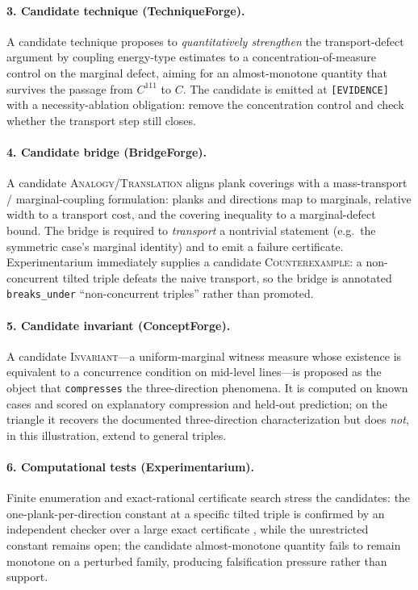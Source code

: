 \documentclass[11pt]{article}
\theoremstyle{definition}
\theoremstyle{remark}
\newcommand{\state}[1]{\texttt{[#1]}}
\newcommand{\rel}[1]{\texttt{#1}}
\newcommand{\ntype}[1]{\textsc{#1}}
\begin{document}
\paragraph{3. Candidate technique (TechniqueForge).} A candidate technique proposes to
\emph{quantitatively strengthen} the transport-defect argument by coupling energy-type estimates to a
concentration-of-measure control on the marginal defect, aiming for an almost-monotone quantity that
survives the passage from $C^{111}$ to $C$. The candidate is emitted at \state{EVIDENCE} with a
necessity-ablation obligation: remove the concentration control and check whether the transport step
still closes.

\paragraph{4. Candidate bridge (BridgeForge).} A candidate \ntype{Analogy}/\ntype{Translation}
aligns plank coverings with a mass-transport / marginal-coupling formulation: planks and directions
map to marginals, relative width to a transport cost, and the covering inequality to a
marginal-defect bound. The bridge is required to \emph{transport} a nontrivial statement (e.g.\ the
symmetric case's marginal identity) and to emit a failure certificate. Experimentarium immediately
supplies a candidate \ntype{Counterexample}: a non-concurrent tilted triple defeats the naive
transport, so the bridge is annotated \rel{breaks\_under} ``non-concurrent triples'' rather than
promoted.

\paragraph{5. Candidate invariant (ConceptForge).} A candidate \ntype{Invariant}---a uniform-marginal
witness measure whose existence is equivalent to a concurrence condition on mid-level lines---is
proposed as the object that \rel{compresses} the three-direction phenomena. It is computed on known
cases and scored on explanatory compression and held-out prediction; on the triangle it recovers the
documented three-direction characterization but does \emph{not}, in this illustration, extend to
general triples.

\paragraph{6. Computational tests (Experimentarium).} Finite enumeration and exact-rational
certificate search stress the candidates: the one-plank-per-direction constant at a specific tilted
triple is confirmed by an independent checker over a large exact certificate
\citep{lucius2026bang}, while the unrestricted constant remains open; the candidate almost-monotone
quantity fails to remain monotone on a perturbed family, producing falsification pressure rather than
support.
\end{document}
